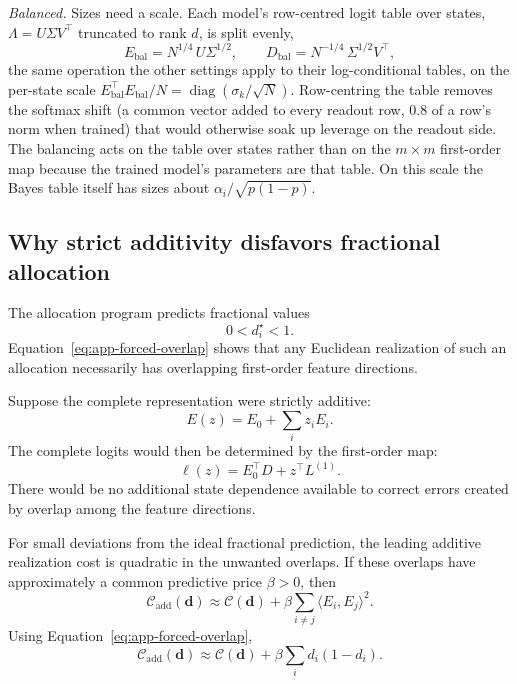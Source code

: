 \emph{Balanced.} Sizes need a scale. Each model's row-centred logit table over states,
\(\Lambda=U\Sigma V^\top\) truncated to rank \(d\), is split evenly,
\begin{equation}
\boxed{
E_{\mathrm{bal}}
=
N^{1/4}\,U\Sigma^{1/2},
\qquad
D_{\mathrm{bal}}
=
N^{-1/4}\,\Sigma^{1/2}V^\top,
}
\label{eq:app-balanced-factorization}
\end{equation}
the same operation the other settings apply to their log-conditional tables, on the
per-state scale \(E_{\mathrm{bal}}^\top E_{\mathrm{bal}}/N=\operatorname{diag}(\sigma_k/\sqrt N)\).
Row-centring the table removes the softmax shift (a common vector added to every
readout row, \(0.8\) of a row's norm when trained) that would otherwise soak up leverage
on the readout side. The balancing acts on the table over states rather than on the
\(m\times m\) first-order map because the trained model's parameters are that table.
On this scale the Bayes table itself has sizes about \(\alpha_i/\sqrt{p(1-p)}\).

\subsection{Why strict additivity disfavors fractional allocation}

The allocation program predicts fractional values
\[
0<d_i^\star<1.
\]
Equation~\eqref{eq:app-forced-overlap} shows that any Euclidean realization of such
an allocation necessarily has overlapping first-order feature directions.

Suppose the complete representation were strictly additive:
\begin{equation}
E(z)
=
E_0+\sum_i z_iE_i.
\label{eq:app-strictly-additive}
\end{equation}
The complete logits would then be determined by the first-order map:
\[
\ell(z)
=
E_0^\top D
+
z^\top L^{(1)}.
\]
There would be no additional state dependence available to correct errors created
by overlap among the feature directions.

For small deviations from the ideal fractional prediction, the leading additive
realization cost is quadratic in the unwanted overlaps. If these overlaps have
approximately a common predictive price \(\beta>0\), then
\begin{equation}
\mathcal C_{\mathrm{add}}(\mathbf d)
\approx
\mathcal C(\mathbf d)
+
\beta
\sum_{i\neq j}
\langle E_i,E_j\rangle^2.
\label{eq:app-additive-overlap-cost}
\end{equation}
Using Equation~\eqref{eq:app-forced-overlap},
\begin{equation}
\boxed{
\mathcal C_{\mathrm{add}}(\mathbf d)
\approx
\mathcal C(\mathbf d)
+
\beta\sum_i d_i(1-d_i).
}
\label{eq:app-additive-allocation-cost}
\end{equation}

